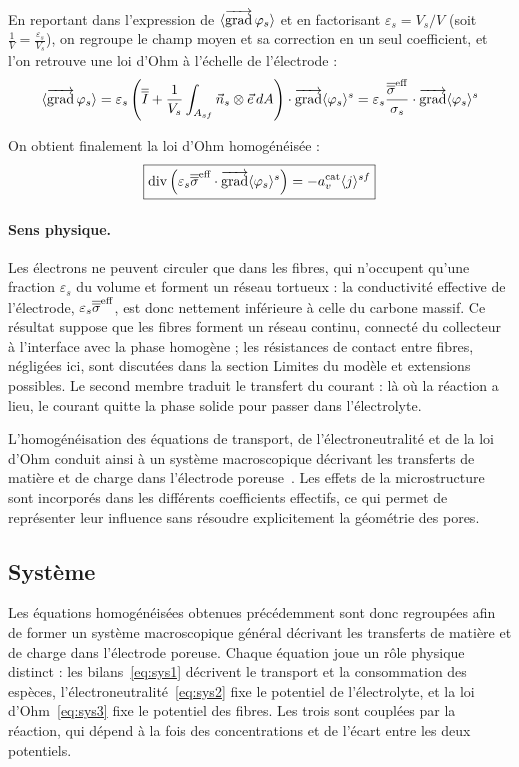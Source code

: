En reportant dans l'expression de $\langle \mathop{\overrightarrow{\operatorname{grad}}}\nolimits\varphi_s \rangle$ et en factorisant
$\varepsilon_s = V_s/V$ (soit $\tfrac{1}{V} = \tfrac{\varepsilon_s}{V_s}$), on
regroupe le champ moyen et sa correction en un seul coefficient, et l'on
retrouve une loi d'Ohm à l'échelle de l'électrode :
\begin{equation}
\langle \mathop{\overrightarrow{\operatorname{grad}}}\nolimits\varphi_s \rangle
= \varepsilon_s \left(\overline{\overline{I}} + \frac{1}{V_s}\int_{A_{sf}} \vec{n}_s\otimes\vec{e}\, dA \right)\cdot\mathop{\overrightarrow{\operatorname{grad}}}\nolimits\langle \varphi_s \rangle^s
= \varepsilon_s \frac{\overline{\overline{\sigma}}^{\text{eff}}}{\sigma_s}\cdot\mathop{\overrightarrow{\operatorname{grad}}}\nolimits\langle \varphi_s \rangle^s
\end{equation}

On obtient finalement la loi d'Ohm homogénéisée :
\begin{equation}
\boxed{
\operatorname{div}\left(
\varepsilon_s \overline{\overline{\sigma}}^{\text{eff}}
\cdot\mathop{\overrightarrow{\operatorname{grad}}}\nolimits\langle \varphi_s \rangle^s
\right)
=
-a_v^{\mathrm{cat}} \langle j \rangle^{sf}
}
\label{eq:ohm_homo}
\end{equation}

\paragraph{Sens physique.} Les électrons ne peuvent circuler que dans les
fibres, qui n'occupent qu'une fraction $\varepsilon_s$ du volume et forment un
réseau tortueux : la conductivité effective de l'électrode,
$\varepsilon_s\overline{\overline{\sigma}}^{\mathrm{eff}}$, est donc nettement inférieure à
celle du carbone massif. Ce résultat suppose que les fibres forment un réseau
continu, connecté du collecteur à l'interface avec la phase homogène ; les
résistances de contact entre fibres, négligées ici, sont discutées dans la
section \og Limites du modèle et extensions possibles\fg{}. Le second membre
traduit le transfert du courant : là où la réaction a lieu, le courant quitte
la phase solide pour passer dans l'électrolyte.

L'homogénéisation des équations de transport, de l'électroneutralité
et de la loi d'Ohm conduit ainsi à un système macroscopique décrivant
les transferts de matière et de charge dans l'électrode poreuse~\cite{mendez-vasquezUpscalingMassElectric2025}. Les
effets de la microstructure sont incorporés dans les différents
coefficients effectifs, ce qui permet de représenter leur influence sans
résoudre explicitement la géométrie des pores.

\subsection*{Système}
Les équations homogénéisées obtenues précédemment sont donc regroupées afin
de former un système macroscopique général décrivant les transferts de matière
et de charge dans l'électrode poreuse. Chaque équation joue un rôle physique
distinct : les bilans~\eqref{eq:sys1} décrivent le transport et la
consommation des espèces, l'électroneutralité~\eqref{eq:sys2} fixe le
potentiel de l'électrolyte, et la loi d'Ohm~\eqref{eq:sys3} fixe le potentiel
des fibres. Les trois sont couplées par la réaction, qui dépend à la fois des
concentrations et de l'écart entre les deux potentiels.


